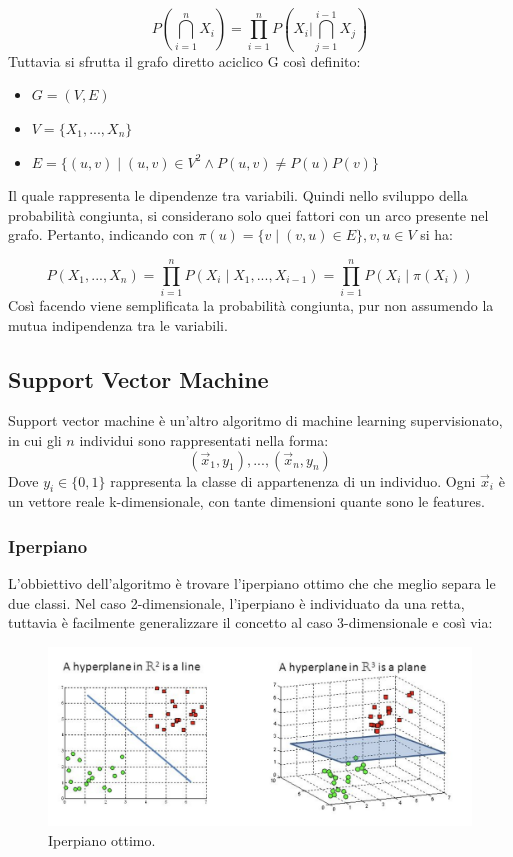 \documentclass[oneside]{book}
\begin{document}
\[ 
P \left( \bigcap_{i=1}^n X_i \right) = 
\prod\limits_{i=1}^{n}P
\left( X_i  \bigg\vert
\bigcap_{j=1}^{i-1} X_j \right)
\]
Tuttavia si sfrutta il grafo diretto aciclico G così definito:
\begin{itemize}
	\item $G = (V, E)$
	\item $V = \{X_1, ..., X_n\}$
	\item $E = \{(u,v) \mid (u,v) \in V^2 \land P(u, v) \neq P(u)P(v) \}$
\end{itemize}
Il quale rappresenta le dipendenze tra variabili. Quindi nello sviluppo della probabilità congiunta, si considerano solo quei fattori con un arco presente nel grafo. Pertanto, indicando con $\pi(u) = \{v \mid (v, u) \in E\}, v,u \in V$ si ha:


$$P(X_1, ..., X_n) = \prod\limits_{i=1}^{n}P(X_i \mid X_1, ..., X_{i-1}) = \prod\limits_{i=1}^{n}P(X_i \mid \pi(X_i)) $$
Così facendo viene semplificata la probabilità congiunta, pur non assumendo la mutua indipendenza tra le variabili.

\newpage
\subsection{Support Vector Machine}
Support vector machine è un'altro algoritmo di machine learning supervisionato, in cui gli $n$ individui sono rappresentati nella forma:
$$(\vec{x}_1, y_1),...,(\vec{x}_n, y_n)$$
Dove $y_i \in \{0, 1\}$ rappresenta la classe di appartenenza di un individuo. Ogni $\vec{x}_i$ è un vettore reale k-dimensionale, con tante dimensioni quante sono le features.

\subsubsection{Iperpiano}
L'obbiettivo dell'algoritmo è trovare l'iperpiano ottimo che che meglio separa le due classi.
Nel caso 2-dimensionale, l'iperpiano è individuato da una retta, tuttavia è facilmente generalizzare il concetto al caso 3-dimensionale e così via:
\begin{figure}[h!]
	\centering
	\includegraphics[width=15cm]{assets/svm-hyperplane.png}
	\caption[Caption for LOF]{Iperpiano ottimo.\footnotemark}
	\label{fig:svm-2d}
\end{figure}
\end{document}
